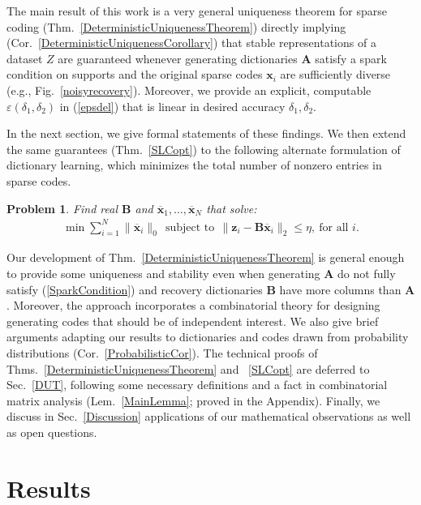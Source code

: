 \documentclass[journal, twocolumn]{IEEEtran}
\newtheorem{problem}{Problem}
\begin{document}
The main result of this work is a very general uniqueness theorem for sparse coding (Thm.~\ref{DeterministicUniquenessTheorem}) directly 
implying (Cor.~\ref{DeterministicUniquenessCorollary}) that stable representations of a dataset $Z$ are guaranteed whenever generating dictionaries $\mathbf{A}$ satisfy a spark condition on supports and the original sparse codes $\mathbf{x}_i$ are sufficiently diverse (e.g., Fig.~\ref{noisyrecovery}).  Moreover, we provide an explicit, computable $\varepsilon(\delta_1, \delta_2)$ in (\ref{epsdel}) that is linear in desired accuracy $\delta_1, \delta_2$.

In the next section, we give formal statements of these findings.  We then extend the same guarantees (Thm.~\ref{SLCopt}) to the following alternate formulation of dictionary learning, which minimizes the total number of nonzero entries in sparse codes.

\begin{problem}\label{OptimizationProblem}
Find real $\mathbf{B}$ and \mbox{$\mathbf{\overline x}_1, \ldots, \mathbf{\overline x}_N$} that solve:
\begin{align}\label{minsum}
\min \sum_{i = 1}^N \|\mathbf{\overline x}_{i}\|_0 \ \
\text{subject to} \ \ \|\mathbf{z}_i - \mathbf{B}\mathbf{\overline x}_i\|_2 \leq \eta, \ \text{for all $i$}.
\end{align}
\end{problem}

Our development of Thm.~\ref{DeterministicUniquenessTheorem} is general enough to provide some uniqueness and stability even when generating $\mathbf{A}$ do not fully satisfy (\ref{SparkCondition}) and recovery dictionaries $\mathbf{B}$ have more columns than $\mathbf{A}$.  Moreover, the approach incorporates a combinatorial theory for designing generating codes that should be of independent interest. We also give brief arguments adapting our results to dictionaries and codes drawn from probability distributions (Cor.~\ref{ProbabilisticCor}). The technical proofs of Thms.~\ref{DeterministicUniquenessTheorem} and ~\ref{SLCopt} are deferred to Sec.~\ref{DUT}, following some necessary definitions and a fact in combinatorial matrix analysis (Lem.~\ref{MainLemma}; proved in the Appendix). Finally, we discuss in Sec.~\ref{Discussion} applications of our mathematical observations as well as open questions. 

\section{Results}\label{Results}
\end{document}

